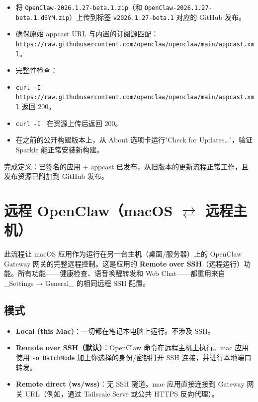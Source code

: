 \begin{itemize}
  \item 将 \texttt{OpenClaw-2026.1.27-beta.1.zip}（和 \texttt{OpenClaw-2026.1.27-beta.1.dSYM.zip}）上传到标签 \texttt{v2026.1.27-beta.1} 对应的 GitHub 发布。
  \item 确保原始 appcast URL 与内置的订阅源匹配：\texttt{https://raw.githubusercontent.com/openclaw/openclaw/main/appcast.xml}。
  \item 完整性检查：
  \item \texttt{curl -I https://raw.githubusercontent.com/openclaw/openclaw/main/appcast.xml} 返回 200。
  \item \texttt{curl -I } 在资源上传后返回 200。
  \item 在之前的公开构建版本上，从 About 选项卡运行"Check for Updates…"，验证 Sparkle 能正常安装新构建。
\end{itemize}


完成定义：已签名的应用 + appcast 已发布，从旧版本的更新流程正常工作，且发布资源已附加到 GitHub 发布。


\clearpage

\section{远程 OpenClaw（macOS $\rightleftarrows$ 远程主机）}


此流程让 macOS 应用作为运行在另一台主机（桌面/服务器）上的 OpenClaw Gateway 网关的完整远程控制。这是应用的 \textbf{Remote over SSH}（远程运行）功能。所有功能——健康检查、语音唤醒转发和 Web Chat——都重用来自 \_Settings → General\_ 的相同远程 SSH 配置。

\subsection{模式}


\begin{itemize}
  \item \textbf{Local (this Mac)}：一切都在笔记本电脑上运行。不涉及 SSH。
  \item \textbf{Remote over SSH（默认）}：OpenClaw 命令在远程主机上执行。mac 应用使用 \texttt{-o BatchMode} 加上你选择的身份/密钥打开 SSH 连接，并进行本地端口转发。
  \item \textbf{Remote direct (ws/wss)}：无 SSH 隧道。mac 应用直接连接到 Gateway 网关 URL（例如，通过 Tailscale Serve 或公共 HTTPS 反向代理）。
\end{itemize}


